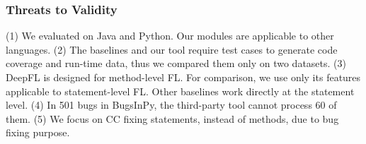 \subsubsection{Threats to Validity}
(1) We evaluated {\tool} on Java and Python. Our modules are
applicable to other languages. (2) The baselines and our tool require
test cases to generate code coverage and run-time data,
thus we compared them only on two datasets.
(3) DeepFL is designed for method-level FL. For comparison, we use
only its features applicable to statement-level FL.
Other baselines work directly at the statement level.
(4) In 501 bugs in BugsInPy, the third-party tool cannot process 60
of them. (5) We focus on CC fixing statements, instead of 
methods, due to bug fixing purpose.





